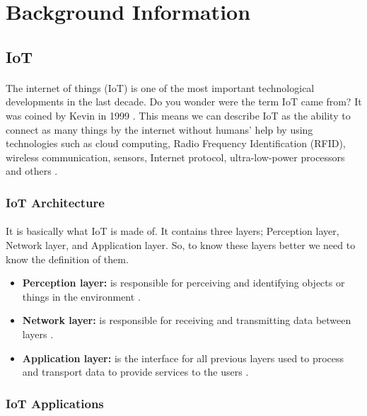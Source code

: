 \documentclass[12pt, oneside, a4paper]{book}
\newcommand\boldcolor[1]{\textcolor{bold}{\textbf{#1}}}
\begin{document}
			\section{Background Information}
			\subsection{IoT}
			\paragraph{}The internet of things (IoT) is one of the most important technological developments in the last decade. Do you wonder were the term IoT came from? It was coined by Kevin in 1999 \cite{iot_1}. This means we can describe IoT as the ability to connect as many things by the internet without humans’ help by using technologies such as cloud computing, Radio Frequency Identification (RFID), wireless communication, sensors, Internet protocol, ultra-low-power processors and others \cite{iot_3}.
			\subsubsection{IoT Architecture}
			\paragraph{} It is basically what IoT is made of. It contains three layers; Perception layer, Network layer, and Application layer. So, to know these layers better we need to know the definition of them.
			\begin{itemize}
				\item \boldcolor{Perception layer:} is responsible for perceiving and identifying objects or things in the environment \cite{iot_4}.
				\item \boldcolor{Network layer:} is responsible for receiving and transmitting data between layers \cite{iot_5}.
				\item \boldcolor{Application layer:} is the interface for all previous layers used to process and transport data to provide services to the users \cite{iot_6}.
			\end{itemize}
			\subsubsection{IoT Applications}
\end{document}
